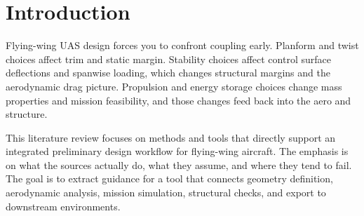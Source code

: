 \chapter{Introduction}
Flying-wing UAS design forces you to confront coupling early. Planform and twist choices affect trim and static margin. Stability choices affect control surface deflections and spanwise loading, which changes structural margins and the aerodynamic drag picture. Propulsion and energy storage choices change mass properties and mission feasibility, and those changes feed back into the aero and structure.

This literature review focuses on methods and tools that directly support an integrated preliminary design workflow for flying-wing aircraft. The emphasis is on what the sources actually do, what they assume, and where they tend to fail. The goal is to extract guidance for a tool that connects geometry definition, aerodynamic analysis, mission simulation, structural checks, and export to downstream environments.

